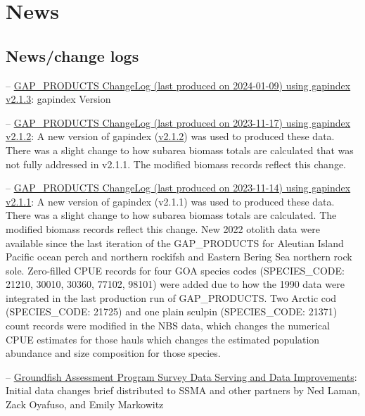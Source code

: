 \documentclass[
  letterpaper,
  oneside,
  open=any]{scrbook}
\begin{document}
\hypertarget{news}{%
\chapter{News}\label{news}}

\hypertarget{newschange-logs}{%
\section{News/change logs}\label{newschange-logs}}

--
\href{https://raw.githubusercontent.com/afsc-gap-products/gap_products/main/content/intro-news/2023-06-01_v2-1-0.txt}{GAP\_PRODUCTS
ChangeLog (last produced on 2024-01-09) using gapindex v2.1.3}: gapindex
Version

--
\href{https://raw.githubusercontent.com/afsc-gap-products/gap_products/main/content/intro-news/2023-06-20_datachangesbreif}{GAP\_PRODUCTS
ChangeLog (last produced on 2023-11-17) using gapindex v2.1.2}: A new
version of gapindex
(\href{https://github.com/afsc-gap-products/gapindex/releases/tag/v2.1.2}{v2.1.2})
was used to produced these data. There was a slight change to how
subarea biomass totals are calculated that was not fully addressed in
v2.1.1. The modified biomass records reflect this change.

--
\href{https://raw.githubusercontent.com/afsc-gap-products/gap_products/main/content/intro-news/2023-11-14_v2-1-1.txt}{GAP\_PRODUCTS
ChangeLog (last produced on 2023-11-14) using gapindex v2.1.1}: A new
version of gapindex (v2.1.1) was used to produced these data. There was
a slight change to how subarea biomass totals are calculated. The
modified biomass records reflect this change. New 2022 otolith data were
available since the last iteration of the GAP\_PRODUCTS for Aleutian
Island Pacific ocean perch and northern rockifsh and Eastern Bering Sea
northern rock sole. Zero-filled CPUE records for four GOA species codes
(SPECIES\_CODE: 21210, 30010, 30360, 77102, 98101) were added due to how
the 1990 data were integrated in the last production run of
GAP\_PRODUCTS. Two Arctic cod (SPECIES\_CODE: 21725) and one plain
sculpin (SPECIES\_CODE: 21371) count records were modified in the NBS
data, which changes the numerical CPUE estimates for those hauls which
changes the estimated population abundance and size composition for
those species.

--
\href{https://raw.githubusercontent.com/afsc-gap-products/gap_products/main/content/intro-news/2023-11-17.txt}{Groundfish
Assessment Program Survey Data Serving and Data Improvements}: Initial
data changes brief distributed to SSMA and other partners by Ned Laman,
Zack Oyafuso, and Emily Markowitz
\end{document}
